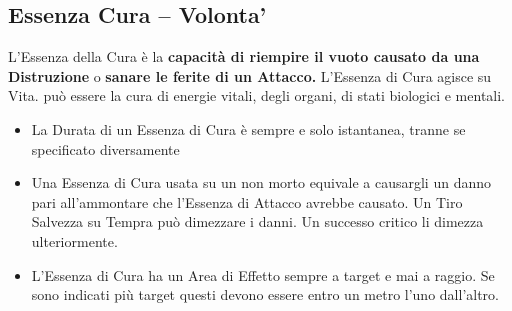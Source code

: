 \documentclass[a4paper,11pt,twoside,openany]{book}
\begin{document}
\pagebreak

\subsection{Essenza Cura -- Volonta'}

\label{essenza-cura---volonta}

L'Essenza della Cura è la \textbf{capacità di riempire il vuoto causato da una Distruzione} o \textbf{sanare le ferite di un Attacco.} L'Essenza di Cura agisce su Vita. può essere la cura di energie vitali, degli organi, di stati biologici e mentali.


\begin{itemize}
\item 
La Durata di un Essenza di Cura è sempre e solo istantanea, tranne se specificato diversamente 
\item 
Una Essenza di Cura usata su un non morto equivale a causargli un danno pari all'ammontare che l'Essenza di Attacco avrebbe causato. Un Tiro Salvezza su Tempra può dimezzare i danni. Un successo critico li dimezza ulteriormente. 
\item 
L'Essenza di Cura ha un Area di Effetto sempre a target e mai a raggio. Se sono indicati più target questi devono essere entro un metro l'uno dall'altro. 
\end{itemize}
\end{document}

